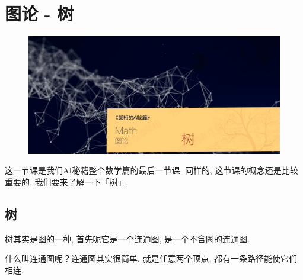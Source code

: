 \chapter{图论 - 树}

\begin{figure}[ht]
  \centering
  \includegraphics[width=1\textwidth]{asset/茶桁的AI秘籍_Math_26.png}
\end{figure}

\newpage

这一节课是我们AI秘籍整个数学篇的最后一节课. 同样的, 这节课的概念还是比较重要的. 我们要来了解一下「树」. 

\section{树}

树其实是图的一种, 首先呢它是一个连通图, 是一个不含圈的连通图. 

什么叫连通图呢？连通图其实很简单, 就是任意两个顶点, 都有一条路径能使它们相连. 

